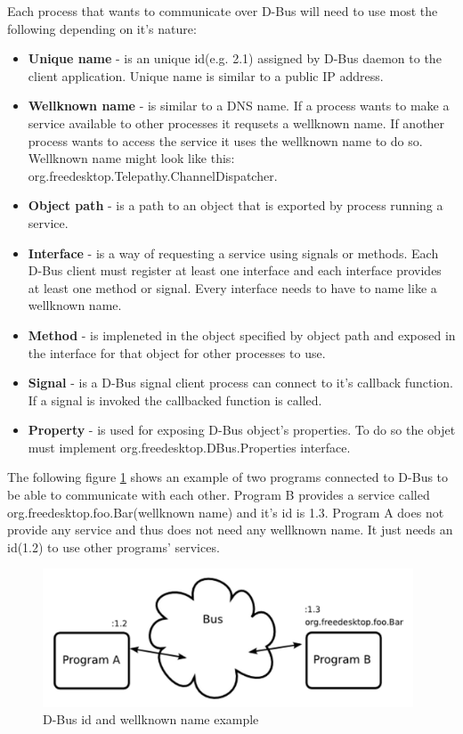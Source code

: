 Each process that wants to communicate over D-Bus will need to use most the following depending on it's nature: 
\begin{itemize}
	\item {\bf Unique name} - is an unique id(e.g. 2.1) assigned by D-Bus daemon to the client application. Unique name is similar to a public IP address.
	\item {\bf Wellknown name} - is similar to a DNS name. If a process wants to make a service available to other processes it requsets a wellknown name. If another process wants to access the service it uses the wellknown name to do so. Wellknown name might look like this: org.freedesktop.Telepathy.ChannelDispatcher.    
	\item {\bf Object path} - is a path to an object that is exported by process running a service.
	\item {\bf Interface} - is a way of requesting a service using signals or methods. Each D-Bus client must register at least one interface and each interface provides at least one method or signal. Every interface needs to have to name like a wellknown name.  
	\item {\bf Method} - is impleneted in the object specified by object path and exposed in the interface for that object for other processes to use. 
	\item {\bf Signal} - is a D-Bus signal client process can connect to it's callback function. If a signal is invoked the callbacked function is called.
	\item {\bf Property} - is used for exposing D-Bus object's properties. To do so the objet must implement org.freedesktop.DBus.Properties interface.
\end{itemize}

The following figure \ref{fig:dbusArchitectureNames} shows an example of two programs connected to D-Bus to be able to communicate with each other. Program B provides a service called org.freedesktop.foo.Bar(wellknown name) and it's id is 1.3. Program A does not provide any service and thus does not need any wellknown name. It just needs an id(1.2) to use other programs' services.\cite{TPWiki}

\begin{figure}[ht]
\begin{center}
	\includegraphics[width=11cm]{fig/dbus-architecture-names.png}
	\caption{D-Bus id and wellknown name example\cite{TPWiki}}
	\label{fig:dbusArchitectureNames}
\end{center}
\end{figure}


